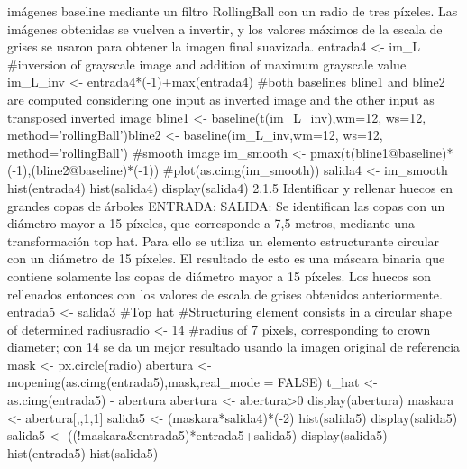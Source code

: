 imágenes baseline mediante un filtro RollingBall con un radio de tres píxeles. Las
imágenes obtenidas se vuelven a invertir, y los valores máximos de la escala de grises se
usaron para obtener la imagen final suavizada.
entrada4 <- im_L
#inversion of grayscale image and addition of maximum grayscale value
im_L_inv <- entrada4*(-1)+max(entrada4)
#both baselines bline1 and bline2 are computed considering one input as inverted image
and the other input as transposed inverted image
bline1 <- baseline(t(im_L_inv),wm=12, ws=12, method='rollingBall')bline2 <- baseline(im_L_inv,wm=12, ws=12, method='rollingBall')
#smooth image
im_smooth <- pmax(t(bline1@baseline)*(-1),(bline2@baseline)*(-1))
#plot(as.cimg(im_smooth))
salida4 <- im_smooth
hist(entrada4)
hist(salida4)
display(salida4)
2.1.5 Identificar y rellenar huecos en grandes copas de árboles
ENTRADA:
SALIDA:
Se identifican las copas con un diámetro mayor a 15 píxeles, que corresponde a 7,5
metros, mediante una transformación top hat. Para ello se utiliza un elemento
estructurante circular con un diámetro de 15 píxeles. El resultado de esto es una máscara
binaria que contiene solamente las copas de diámetro mayor a 15 píxeles. Los huecos
son rellenados entonces con los valores de escala de grises obtenidos anteriormente.
entrada5 <- salida3
#Top hat
#Structuring element consists in a circular shape of determined radiusradio <- 14 #radius of 7 pixels, corresponding to crown diameter; con 14 se da un mejor
resultado usando la imagen original de referencia
mask <- px.circle(radio)
abertura <- mopening(as.cimg(entrada5),mask,real_mode = FALSE)
t_hat <- as.cimg(entrada5) - abertura
abertura <- abertura>0
display(abertura)
maskara <- abertura[,,1,1]
salida5 <- (maskara*salida4)*(-2)
hist(salida5)
display(salida5)
salida5 <- ((!maskara&entrada5)*entrada5+salida5)
display(salida5)
hist(entrada5)
hist(salida5)

